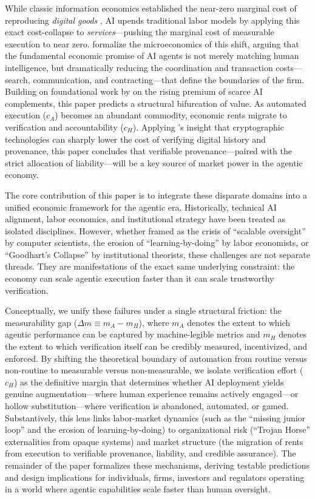 \documentclass[12pt, letter]{article}
\begin{document}
While classic information economics established the near-zero marginal cost of reproducing \emph{digital goods} \citep{ShapiroVarian1998}, AI upends traditional labor models by applying this exact cost-collapse to \emph{services}---pushing the marginal cost of measurable execution to near zero. \citet{ShahidiEtAl2025} formalize the microeconomics of this shift, arguing that the fundamental economic promise of AI agents is not merely matching human intelligence, but dramatically reducing the coordination and transaction costs---search, communication, and contracting---that define the boundaries of the firm. Building on foundational work by \citet{AgrawalGansGoldfarb2018} on the rising premium of scarce AI complements, this paper predicts a structural bifurcation of value. As automated execution ($c_A$) becomes an abundant commodity, economic rents migrate to verification and accountability ($c_H$). Applying \citet{CataliniGans2020}'s insight that cryptographic technologies can sharply lower the cost of verifying digital history and provenance, this paper concludes that verifiable provenance---paired with the strict allocation of liability---will be a key source of market power in the agentic economy.

The core contribution of this paper is to integrate these disparate domains into a unified economic framework for the agentic era. Historically, technical AI alignment, labor economics, and institutional strategy have been treated as isolated disciplines. However, whether framed as the crisis of ``scalable oversight'' by computer scientists, the erosion of ``learning-by-doing'' by labor economists, or ``Goodhart's Collapse'' by institutional theorists, these challenges are not separate threads. They are manifestations of the exact same underlying constraint: the economy can scale agentic execution faster than it can scale trustworthy verification.

Conceptually, we unify these failures under a single structural friction: the measurability gap ($\Delta m \equiv m_A - m_H$), where $m_A$ denotes the extent to which agentic performance can be captured by machine-legible metrics and $m_H$ denotes the extent to which verification itself can be credibly measured, incentivized, and enforced. By shifting the theoretical boundary of automation from routine versus non-routine to measurable versus non-measurable, we isolate verification effort ($c_H$) as the definitive margin that determines whether AI deployment yields genuine augmentation---where human experience remains actively engaged---or hollow substitution---where verification is abandoned, automated, or gamed. Substantively, this lens links labor-market dynamics (such as the ``missing junior loop'' and the erosion of learning-by-doing) to organizational risk (``Trojan Horse'' externalities from opaque systems) and market structure (the migration of rents from execution to verifiable provenance, liability, and credible assurance). The remainder of the paper formalizes these mechanisms, deriving testable predictions and design implications for individuals, firms, investors and regulators operating in a world where agentic capabilities scale faster than human oversight.
\end{document}
